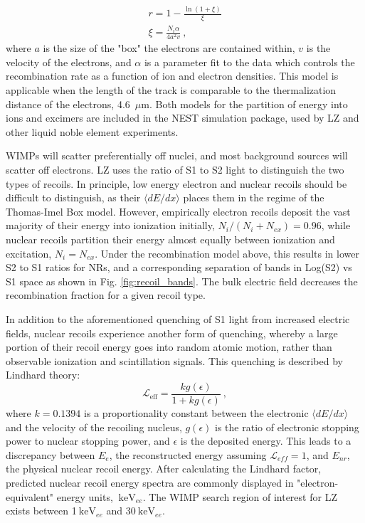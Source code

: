 \begin{align}
    r = 1 - \frac{\ln(1 + \xi) }{\xi}\\
    \xi = \frac{N_i \alpha}{4 a^2 v}~,
\end{align}
\noindent
where $a$ is the size of the "box" the electrons are contained within, $v$ is the velocity of the electrons, and $\alpha$ is a parameter fit to the data which controls the recombination rate as a function of ion and electron densities. 
This model is applicable when the length of the track is comparable to the thermalization distance of the electrons, 4.6~$\mu$m.
Both models for the partition of energy into ions and excimers are included in the NEST simulation package\cite{lenardo_global_2015}, used by LZ and other liquid noble element experiments.

WIMPs will scatter preferentially off nuclei, and most background sources will scatter off electrons.
LZ uses the ratio of S1 to S2 light to distinguish the two types of recoils.
In principle, low energy electron and nuclear recoils should be difficult to distinguish, as their $\langle dE/dx\rangle$ places them in the regime of the Thomas-Imel Box model.
However, empirically electron recoils deposit the vast majority of their energy into ionization initially, $N_i / (N_i + N_{ex}) = 0.96$, while nuclear recoils partition their energy almost equally between ionization and excitation, $N_i = N_{ex}$. 
Under the recombination model above, this results in lower S2 to S1 ratios for NRs, and a corresponding separation of bands in Log(S2) vs S1 space as shown in Fig. \ref{fig:recoil_bands}.
The bulk electric field decreases the recombination fraction for a given recoil type.

In addition to the aforementioned quenching of S1 light from increased electric fields, nuclear recoils experience another form of quenching, whereby a large portion of their recoil energy goes into random atomic motion, rather than observable ionization and scintillation signals.
This quenching is described by Lindhard theory\cite{lindhard_range_1963, sorensen_nuclear_2011}:
\begin{equation}
    \mathcal{L}_{\mathrm{eff}} = \frac{k g(\epsilon)}{1 + k g(\epsilon)}~,
\end{equation}
\noindent
where $k = 0.1394$\cite{lenardo_global_2015} is a proportionality constant between the electronic $\langle dE / dx \rangle $ and the velocity of the recoiling nucleus, $g(\epsilon)$ is the ratio of  electronic stopping power to nuclear stopping power, and $\epsilon$ is the deposited energy.
This leads to a discrepancy  between $E_{e}$, the reconstructed energy assuming $\mathcal{L}_{eff}=1$,  and  $E_{nr}$, the physical nuclear recoil energy.
After calculating the Lindhard factor, predicted nuclear recoil energy spectra are commonly displayed in "electron-equivalent" energy units, $\mathrm{~keV}_{ee}$.
The WIMP search region of interest for LZ exists between 1$\mathrm{~keV}_{ee}$ and 30$\mathrm{~keV}_{ee}$.
